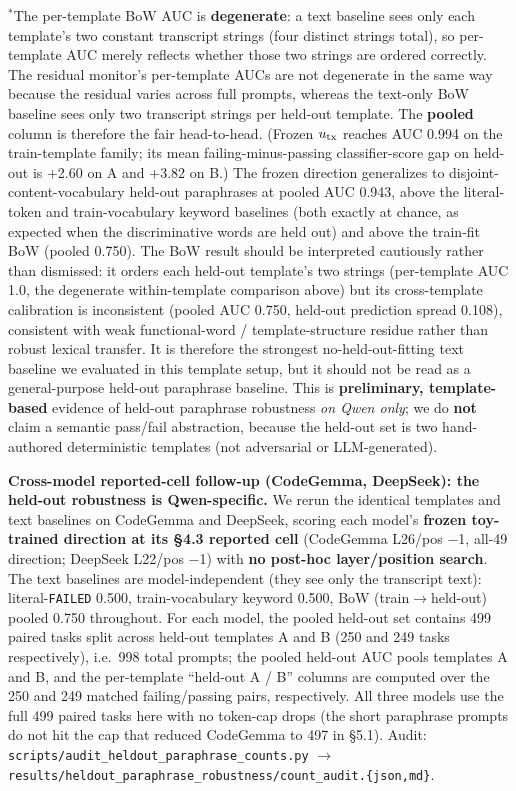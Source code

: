 \documentclass[
  11pt,
  a4paper]{article}
\begin{document}
\(^\ast\)The per-template BoW AUC is \textbf{degenerate}: a text
baseline sees only each template's two constant transcript strings (four
distinct strings total), so per-template AUC merely reflects whether
those two strings are ordered correctly. The residual monitor's
per-template AUCs are not degenerate in the same way because the
residual varies across full prompts, whereas the text-only BoW baseline
sees only two transcript strings per held-out template. The
\textbf{pooled} column is therefore the fair head-to-head. (Frozen
\(u_{\rm tx}\) reaches AUC 0.994 on the train-template family; its mean
failing-minus-passing classifier-score gap on held-out is +2.60 on A and
+3.82 on B.) The frozen direction generalizes to
disjoint-content-vocabulary held-out paraphrases at pooled AUC 0.943,
above the literal-token and train-vocabulary keyword baselines (both
exactly at chance, as expected when the discriminative words are held
out) and above the train-fit BoW (pooled 0.750). The BoW result should
be interpreted cautiously rather than dismissed: it orders each held-out
template's two strings (per-template AUC 1.0, the degenerate
within-template comparison above) but its cross-template calibration is
inconsistent (pooled AUC 0.750, held-out prediction spread 0.108),
consistent with weak functional-word / template-structure residue rather
than robust lexical transfer. It is therefore the strongest
no-held-out-fitting text baseline we evaluated in this template setup,
but it should not be read as a general-purpose held-out paraphrase
baseline. This is \textbf{preliminary, template-based} evidence of
held-out paraphrase robustness \emph{on Qwen only}; we do \textbf{not}
claim a semantic pass/fail abstraction, because the held-out set is two
hand-authored deterministic templates (not adversarial or
LLM-generated).

\textbf{Cross-model reported-cell follow-up (CodeGemma, DeepSeek): the
held-out robustness is Qwen-specific.} We rerun the identical templates
and text baselines on CodeGemma and DeepSeek, scoring each model's
\textbf{frozen toy-trained direction at its \S{}4.3 reported cell}
(CodeGemma L26/pos \ensuremath{-}1, all-49 direction; DeepSeek L22/pos \ensuremath{-}1) with
\textbf{no post-hoc layer/position search}. The text baselines are
model-independent (they see only the transcript text):
literal-\texttt{FAILED} 0.500, train-vocabulary keyword 0.500, BoW
(train\ensuremath{\rightarrow}held-out) pooled 0.750 throughout. For each model, the pooled
held-out set contains 499 paired tasks split across held-out templates A
and B (250 and 249 tasks respectively), i.e.~998 total prompts; the
pooled held-out AUC pools templates A and B, and the per-template
``held-out A / B'' columns are computed over the 250 and 249 matched
failing/passing pairs, respectively. All three models use the full 499
paired tasks here with no token-cap drops (the short paraphrase prompts
do not hit the cap that reduced CodeGemma to 497 in \S{}5.1). Audit:
\texttt{scripts/audit\_heldout\_paraphrase\_counts.py} \ensuremath{\rightarrow}
\texttt{results/heldout\_paraphrase\_robustness/count\_audit.\{json,md\}}.
\end{document}
